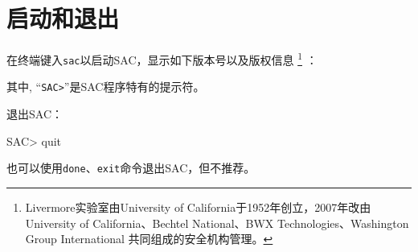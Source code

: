 \section{启动和退出}
在终端键入\lstinline{sac}以启动SAC，显示如下版本号以及版权信息
\footnote{Livermore实验室由University of California于1952年创立，2007年改由
University of California、Bechtel National、BWX Technologies、Washington Group International
共同组成的安全机构管理。}
：
其中, ``\lstinline{SAC>}''是SAC程序特有的提示符。

退出SAC：
\begin{SACCode}
SAC> quit
\end{SACCode}
也可以使用\lstinline{done}、\lstinline{exit}命令退出SAC，但不推荐。
